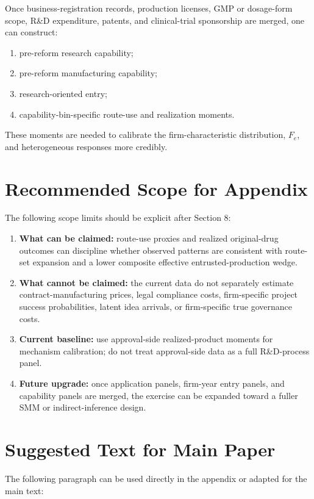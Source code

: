 \documentclass[12pt]{article}
\newcommand{\1}{\mathbf{1}}
\begin{document}
Once business-registration records, production licenses, GMP or dosage-form scope, R\&D expenditure, patents, and clinical-trial sponsorship are merged, one can construct:
\begin{enumerate}[leftmargin=2em]
    \item pre-reform research capability;
    \item pre-reform manufacturing capability;
    \item research-oriented entry;
    \item capability-bin-specific route-use and realization moments.
\end{enumerate}
These moments are needed to calibrate the firm-characteristic distribution, $F_e$, and heterogeneous responses more credibly.

\section{Recommended Scope for Appendix}

The following scope limits should be explicit after Section 8:
\begin{enumerate}[leftmargin=2em]
    \item \textbf{What can be claimed:} route-use proxies and realized original-drug outcomes can discipline whether observed patterns are consistent with route-set expansion and a lower composite effective entrusted-production wedge.
    \item \textbf{What cannot be claimed:} the current data do not separately estimate contract-manufacturing prices, legal compliance costs, firm-specific project success probabilities, latent idea arrivals, or firm-specific true governance costs.
    \item \textbf{Current baseline:} use approval-side realized-product moments for mechanism calibration; do not treat approval-side data as a full R\&D-process panel.
    \item \textbf{Future upgrade:} once application panels, firm-year entry panels, and capability panels are merged, the exercise can be expanded toward a fuller SMM or indirect-inference design.
\end{enumerate}

\section{Suggested Text for Main Paper}

The following paragraph can be used directly in the appendix or adapted for the main text:
\end{document}
